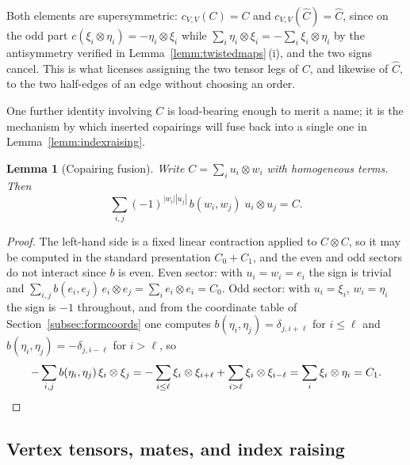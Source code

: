 \documentclass[11pt]{article}
\newtheorem{lemm}[theo]{Lemma}
\newcommand{\copair}{C}                           %
\newcommand{\twistedC}{\widehat{C}}               %
\begin{document}
Both elements are supersymmetric: $c_{V,V}(\copair)=\copair$ and
$c_{V,V}(\twistedC)=\twistedC$, since on the odd part
$c(\xi_{i}\otimes\eta_{i})=-\eta_{i}\otimes\xi_{i}$ while
$\sum_{i}\eta_{i}\otimes\xi_{i}=-\sum_{i}\xi_{i}\otimes\eta_{i}$
by the antisymmetry verified in
Lemma~\ref{lemm:twistedmaps}\,(i), and the two signs cancel. This
is what licenses assigning the two tensor legs of $\copair$, and
likewise of $\twistedC$, to the two half-edges of an edge without
choosing an order.

One further identity involving $\copair$ is load-bearing enough to
merit a name; it is the mechanism by which inserted copairings will
fuse back into a single one in Lemma~\ref{lemm:indexraising}.

\begin{lemm}[Copairing fusion]\label{lemm:fusion}
Write $\copair=\sum_{i}u_{i}\otimes w_{i}$ with homogeneous terms.
Then
\[
\sum_{i,j}(-1)^{|w_{i}||u_{j}|}\,b(w_{i},w_{j})\;
u_{i}\otimes u_{j}=\copair .
\]
\end{lemm}

\begin{proof}
The left-hand side is a fixed linear contraction applied to
$\copair\otimes\copair$, so it may be computed in the standard
presentation $\copair_{0}+\copair_{1}$, and the even and odd
sectors do not interact since $b$ is even. Even sector: with
$u_{i}=w_{i}=e_{i}$ the sign is trivial and
$\sum_{i,j}b(e_{i},e_{j})\,e_{i}\otimes e_{j}
=\sum_{i}e_{i}\otimes e_{i}=\copair_{0}$. Odd sector: with
$u_{i}=\xi_{i}$, $w_{i}=\eta_{i}$ the sign is $-1$ throughout, and
from the coordinate table of Section~\ref{subsec:formcoords} one
computes $b(\eta_{i},\eta_{j})=\delta_{j,i+\ell}$ for $i\le\ell$
and $b(\eta_{i},\eta_{j})=-\delta_{j,i-\ell}$ for $i>\ell$, so
\[
-\sum_{i,j}b(\eta_{i},\eta_{j})\,\xi_{i}\otimes\xi_{j}
=-\sum_{i\le\ell}\xi_{i}\otimes\xi_{i+\ell}
+\sum_{i>\ell}\xi_{i}\otimes\xi_{i-\ell}
=\sum_{i}\xi_{i}\otimes\eta_{i}=\copair_{1}. \qedhere
\]
\end{proof}

\subsection{Vertex tensors, mates, and index
raising}\label{subsec:mates}
\end{document}
